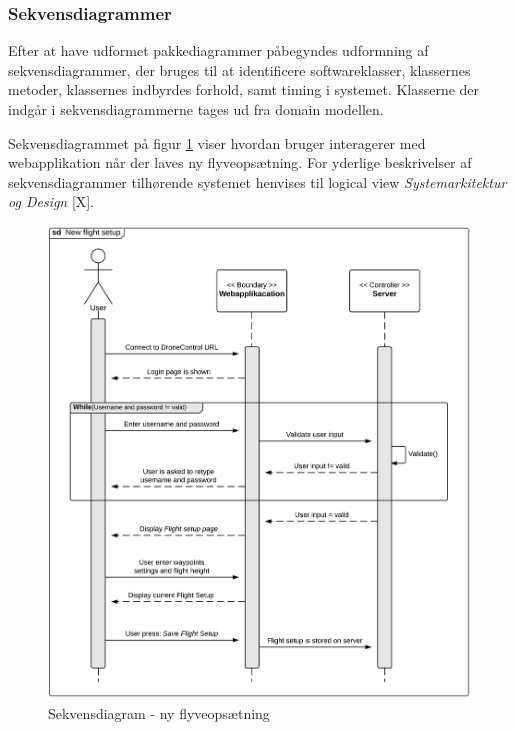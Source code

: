 \newpage

\subsubsection*{Sekvensdiagrammer}
\vspace{-0.3cm}	

Efter at have udformet pakkediagrammer påbegyndes udformning af sekvensdiagrammer, der bruges til at identificere softwareklasser, klassernes metoder, klassernes indbyrdes forhold, samt timing i systemet. Klasserne der indgår i sekvensdiagrammerne tages ud fra domain modellen. 

Sekvensdiagrammet på figur \ref{fig:login_flysetting} viser hvordan bruger interagerer med webapplikation når der laves ny flyveopsætning. For yderlige beskrivelser af sekvensdiagrammer tilhørende systemet henvises til logical view \textit{Systemarkitektur og Design} [X].
 
\begin{figure}[H]
	\centering
	\includegraphics[width=1\textwidth]{Billeder/sekvens.png}
	\vspace{-0.6cm}	
	\caption{Sekvensdiagram - ny flyveopsætning}
	\label{fig:login_flysetting}
\end{figure}

